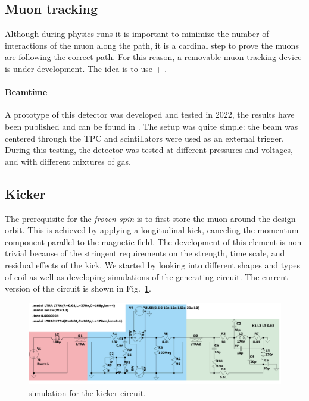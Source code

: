 \begin{refsection}
    \subsection{Muon tracking}
    \label{sec:muEDM:gridpix:beamtime}
        Although during physics runs it is important to minimize the number of interactions of the muon along the path, it is a cardinal step to prove the muons are following the correct path.
        For this reason, a removable muon-tracking device is under development.
        The idea is to use \tpc + \grid.

        \paragraph{Beamtime}
        A prototype of this detector was developed and tested in 2022, the results have been published and can be found in \cite{muEDM:PSI:GridPix}.
        The setup was quite simple: the beam was centered through the TPC and scintillators were used as an external trigger.
        During this testing, the detector was tested at different pressures and voltages, and with different mixtures of gas.
    \subsection{Kicker}
        The prerequisite for the \textit{frozen spin} is to first store the muon around the design orbit.
        This is achieved by applying a longitudinal kick, canceling the momentum component parallel to the magnetic field.
        The development of this element is non-trivial because of the stringent requirements on the strength, time scale, and residual effects of the kick.
        We started by looking into different shapes and types of coil as well as developing \ltsp simulations of the generating circuit.
        The current version of the circuit is shown in Fig.~\ref{fig:muEDM:kicker:circuit}.
        
        \begin{figure}
            \centering
            \includegraphics[width = \textwidth]{Figures/muEDM/CircuitMuonKickerV3_1.png}
            \caption{\ltsp simulation for the kicker circuit.}
            \label{fig:muEDM:kicker:circuit}
        \end{figure}


\end{refsection}
